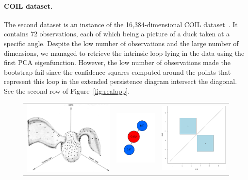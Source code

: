 \paragraph{COIL dataset.}
The second dataset is an instance of the 16,384-dimensional COIL dataset~\cite{Nene96}. 
It contains 72 observations, each of which being a picture of a duck taken at a specific angle.
Despite the low number of observations and the large number of dimensions, we managed to retrieve the intrinsic 
loop lying in the data using the first PCA eigenfunction. However, the low number of observations made the bootstrap fail 
since the confidence squares computed around 
the points that represent this loop in the extended persistence diagram intersect the diagonal.
See the second row of Figure~\ref{fig:realapp}.

\begin{figure}
\begin{tabular}{ccc}
\includegraphics[width=6.5cm]{figures/diabete} & \includegraphics[width=3cm]{figures/diab_mapperecc_subs100_g40.pdf} & \includegraphics[width=5cm]{figures/diab_conf85_boot100.pdf} \\

\end{tabular}
\end{figure}
